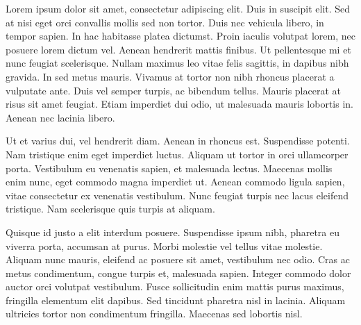 Lorem ipsum dolor sit amet, consectetur adipiscing elit. Duis in suscipit elit. Sed at nisi eget orci convallis mollis sed non tortor. Duis nec vehicula libero, in tempor sapien. In hac habitasse platea dictumst. Proin iaculis volutpat lorem, nec posuere lorem dictum vel. Aenean hendrerit mattis finibus. Ut pellentesque mi et nunc feugiat scelerisque. Nullam maximus leo vitae felis sagittis, in dapibus nibh gravida. In sed metus mauris. Vivamus at tortor non nibh rhoncus placerat a vulputate ante. Duis vel semper turpis, ac bibendum tellus. Mauris placerat at risus sit amet feugiat. Etiam imperdiet dui odio, ut malesuada mauris lobortis in. Aenean nec lacinia libero.

Ut et varius dui, vel hendrerit diam. Aenean in rhoncus est. Suspendisse potenti. Nam tristique enim eget imperdiet luctus. Aliquam ut tortor in orci ullamcorper porta. Vestibulum eu venenatis sapien, et malesuada lectus. Maecenas mollis enim nunc, eget commodo magna imperdiet ut. Aenean commodo ligula sapien, vitae consectetur ex venenatis vestibulum. Nunc feugiat turpis nec lacus eleifend tristique. Nam scelerisque quis turpis at aliquam.

Quisque id justo a elit interdum posuere. Suspendisse ipsum nibh, pharetra eu viverra porta, accumsan at purus. Morbi molestie vel tellus vitae molestie. Aliquam nunc mauris, eleifend ac posuere sit amet, vestibulum nec odio. Cras ac metus condimentum, congue turpis et, malesuada sapien. Integer commodo dolor auctor orci volutpat vestibulum. Fusce sollicitudin enim mattis purus maximus, fringilla elementum elit dapibus. Sed tincidunt pharetra nisl in lacinia. Aliquam ultricies tortor non condimentum fringilla. Maecenas sed lobortis nisl.
